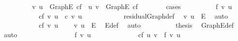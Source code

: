 \begin{isabellebody}
\ \ \ \ \ \ \isamarkupfalse%
\ \isamarkupfalse%
\ {\isachardoublequoteopen}{\isacharparenleft}v{\isacharcomma}\ u{\isacharparenright}\ {\isasymin}\ Graph{\isachardot}E\ cf\ {\isasymor}\ {\isacharparenleft}u{\isacharcomma}\ v{\isacharparenright}\ {\isasymin}\ Graph{\isachardot}E\ cf{\isachardoublequoteclose}\isanewline
\ \ \ \ \ \ \isamarkupfalse%
\ {\isacharparenleft}cases{\isacharparenright}\isanewline
\ \ \ \ \ \ \ \ \isamarkupfalse%
\ {\isachardoublequoteopen}f\ {\isacharparenleft}v{\isacharcomma}\ u{\isacharparenright}\ {\isacharequal}\ {}{\isachardoublequoteclose}\isanewline
\ \ \ \ \ \ \ \ \isamarkupfalse%
\ \isamarkupfalse%
\ {\isachardoublequoteopen}cf\ {\isacharparenleft}v{\isacharcomma}\ u{\isacharparenright}\ {\isacharequal}\ c\ {\isacharparenleft}v{\isacharcomma}\ u{\isacharparenright}{\isachardoublequoteclose}\isanewline
\ \ \ \ \ \ \ \ \ \ \isamarkupfalse%
\ residualGraph{\isacharunderscore}def\ \isamarkupfalse%
\ {\isacharbackquoteopen}{\isacharparenleft}v{\isacharcomma}\ u{\isacharparenright}\ {\isasymin}\ E{\isacharbackquoteclose}\ \isamarkupfalse%
\ {\isacharparenleft}auto{\isacharparenright}\isanewline
\ \ \ \ \ \ \ \ \isamarkupfalse%
\ \isamarkupfalse%
\ {\isachardoublequoteopen}cf\ {\isacharparenleft}v{\isacharcomma}\ u{\isacharparenright}\ {\isasymnoteq}\ {}{\isachardoublequoteclose}\ \isamarkupfalse%
\ {\isacharbackquoteopen}{\isacharparenleft}v{\isacharcomma}\ u{\isacharparenright}\ {\isasymin}\ E{\isacharbackquoteclose}\ \isamarkupfalse%
\ E{\isacharunderscore}def\ \isamarkupfalse%
\ auto\isanewline
\ \ \ \ \ \ \ \ \isamarkupfalse%
\ {\isacharquery}thesis\ \isamarkupfalse%
\ Graph{\isachardot}E{\isacharunderscore}def\ \isamarkupfalse%
\ auto\isanewline
\ \ \ \ \ \ \isamarkupfalse%
\isanewline
\ \ \ \ \ \ \ \ \isamarkupfalse%
\ {\isachardoublequoteopen}f\ {\isacharparenleft}v{\isacharcomma}\ u{\isacharparenright}\ {\isasymnoteq}\ {}{\isachardoublequoteclose}\isanewline
\ \ \ \ \ \ \ \ \isamarkupfalse%
\ \isamarkupfalse%
\ {\isachardoublequoteopen}cf\ {\isacharparenleft}u{\isacharcomma}\ v{\isacharparenright}\ {\isacharequal}\ f\ {\isacharparenleft}v{\isacharcomma}\ u{\isacharparenright}{\isachardoublequoteclose}\ \isamarkupfalse%

\end{isabellebody}
